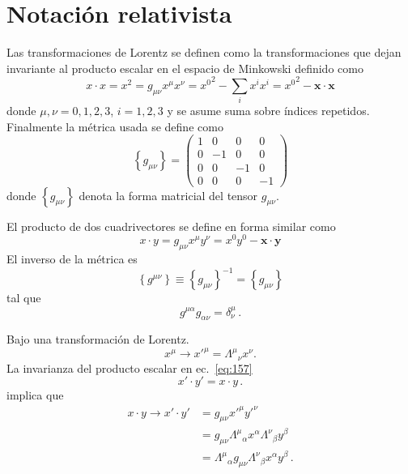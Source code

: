 \section{Notaci\'on relativista}
\label{sec:srn}
\begin{frame}
Las transformaciones de Lorentz se definen como la transformaciones que dejan invariante al producto escalar en el espacio de Minkowski definido como
\begin{equation}
  \label{eq:146}
 x\cdot x= x^2=g_{\mu\nu}x^\mu x^\nu={x^0}^2-\sum_i x^i x^i={x^0}^2-\mathbf{x}\cdot\mathbf{x}
\end{equation}
donde $\mu,\nu=0,1,2,3$, $i=1,2,3$ y se asume suma sobre índices repetidos.
Finalmente la métrica usada se define como
\begin{equation}
  \label{eq:gmunu}
  \left\{ g_{\mu\nu} \right\}=
  \begin{pmatrix}
    1&0&0&0\\
    0&-1&0&0\\
    0&0&-1&0\\
    0&0&0&-1
  \end{pmatrix}
\end{equation}
donde $\left\{ g_{\mu\nu} \right\}$ denota la forma matricial del tensor $g_{\mu\nu}$.  



El producto de dos cuadrivectores se define en forma similar como
\begin{equation}
\label{eq:157}
  x\cdot y=g_{\mu\nu}x^\mu y^\nu=x^0y^0-\mathbf{x}\cdot\mathbf{y}
\end{equation}
El inverso de la métrica es
\begin{equation}
  \left\{ g^{\mu\nu} \right\}\equiv\left\{ g_{\mu\nu} \right\}^{-1}=\left\{ g_{\mu\nu} \right\}
\end{equation}
tal que
\begin{equation}
  g^{\mu\alpha}g_{\alpha\nu}=\delta^\mu_\nu\,.
\end{equation}

Bajo una transformación de Lorentz.
\begin{equation}
  \label{eq:xx5}
  x^\mu\to {x'}^\mu={\Lambda^\mu}_{\nu}x^\nu.
\end{equation}
La invarianza del producto escalar en ec.~\eqref{eq:157}
\begin{equation}
  {x'}\cdot {y'}=x\cdot y\,.
\end{equation}
implica que
\begin{align}
\label{eq:Lambdasteps}
{x}\cdot{y}\to  {x'}\cdot{y'}&=g_{\mu\nu}{x'}^\mu{y'}^{\nu}\nonumber\\
  &=g_{\mu\nu}{\Lambda^{\mu}}_{\alpha}x^{\alpha}{\Lambda^{\nu}}_{\beta}y^{\beta}\nonumber\\
 &={\Lambda^{\mu}}_{\alpha}g_{\mu\nu}{\Lambda^{\nu}}_{\beta}x^{\alpha}y^{\beta}\,.
\end{align}


\end{frame}
